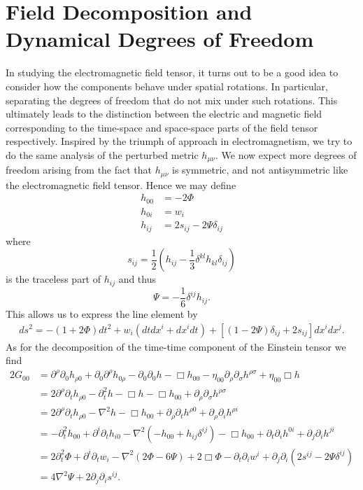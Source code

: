 \documentclass[twoside,utf8]{article}
\begin{document}
\section{Field Decomposition and Dynamical Degrees of Freedom}
In studying the electromagnetic field tensor, it turns out to be a good idea to consider how the components behave under spatial rotations. In particular, separating the degrees of freedom that do not mix under such rotations. This ultimately leads to the distinction between the electric and magnetic field corresponding to the time-space and space-space parts of the field tensor respectively. Inspired by the triumph of approach in electromagnetism, we try to do the same analysis of the perturbed metric $h_{\mu\nu}$. We now expect more degrees of freedom arising from the fact that $h_{\mu\nu}$ is symmetric, and not antisymmetric like the electromagnetic field tensor. Hence we may define
\begin{align*}
  h_{00} &= -2\Phi \\
  h_{0i} &= w_i \\
  h_{ij} &= 2s_{ij}-2\Psi \delta_{ij}
\end{align*}
where
\[
s_{ij} = \frac{1}{2}\left( h_{ij}-\frac{1}{3}\delta^{kl}h_{kl}\delta_{ij} \right)
\]
is the traceless part of $h_{ij}$ and thus
\[
\Psi = -\frac{1}{6}\delta^{ij}h_{ij}.
\]
This allows us to express the line element by
\begin{align}
  ds^2 = -(1+2\Phi)dt^2+w_i(dtdx^i+dx^idt)+[(1-2\Psi)\delta_{ij}+2s_{ij}]dx^idx^j. \label{eq:LineElement}
\end{align}
As for the decomposition of the time-time component of the Einstein tensor we find
\begin{align*}
  2G_{00}
  &= \partial^\rho \partial_0 h_{\rho 0} + \partial_0 \partial^\rho h_{0 \rho} - \partial_0 \partial_0 h - \Box h_{00}
  -\eta_{00}\partial_\rho \partial_\sigma h^{\rho \sigma} + \eta_{00}\Box h \\
  &= 2\partial^\rho \partial_t h_{\rho 0} - \partial_t^2 h - \Box h - \Box h_{00}
  +\partial_\rho \partial_\sigma h^{\rho \sigma} \\
  &= 2\partial^\rho \partial_t h_{\rho 0} - \nabla^2 h - \Box h_{00}
  +\partial_\rho \partial_t h^{\rho 0}
  +\partial_\rho \partial_i h^{\rho i} \\
  &= -\partial_t^2 h_{0 0} + \partial^i \partial_t h_{i 0}
  - \nabla^2 (-h_{00}+h_{ij}\delta^{ij}) - \Box h_{00}
  +\partial_t \partial_i h^{0 i}
  +\partial_j \partial_i h^{j i}\\
  &= 2\partial_t^2 \Phi + \partial^i \partial_t w_i
  - \nabla^2 (2\Phi-6\Psi) +2 \Box \Phi
  -\partial_t \partial_i w^i
  +\partial_j \partial_i (2s^{ij}-2\Psi \delta^{ij})\\
  &= 4\nabla^2 \Psi
  +2 \partial_j \partial_i s^{ij}. \\
\end{align*}
\end{document}
